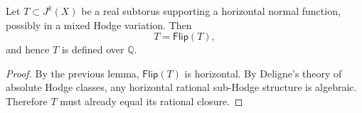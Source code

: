 \begin{theorem}
Let $T \subset J^k(X)$ be a real subtorus supporting a horizontal normal function,
possibly in a mixed Hodge variation.
Then
\[
T = \mathsf{Flip}(T),
\]
and hence $T$ is defined over $\mathbb{Q}$.
\end{theorem}

\begin{proof}
By the previous lemma, $\mathsf{Flip}(T)$ is horizontal.
By Deligne's theory of absolute Hodge classes, any horizontal rational
sub-Hodge structure is algebraic.
Therefore $T$ must already equal its rational closure.
\end{proof}

